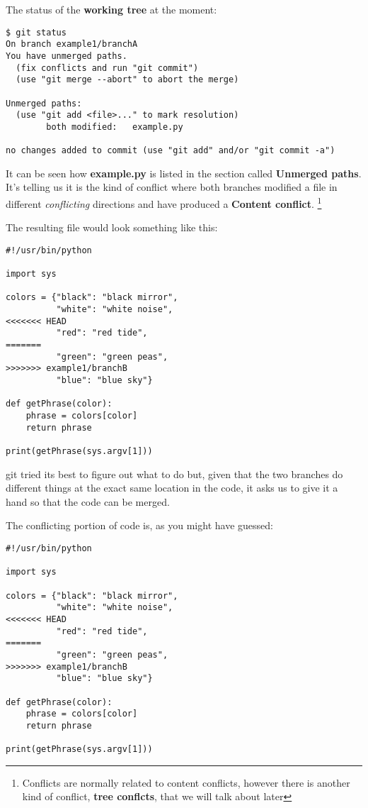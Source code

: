 The status of the {\bf working tree} at the moment:
\begin{lstlisting}[style=console_style, caption={\bf Example 1} - git status]
$ git status
On branch example1/branchA
You have unmerged paths.
  (fix conflicts and run "git commit")
  (use "git merge --abort" to abort the merge)

Unmerged paths:
  (use "git add <file>..." to mark resolution)
        both modified:   example.py

no changes added to commit (use "git add" and/or "git commit -a")
\end{lstlisting}

It can be seen how {\bf example.py} is listed in the section called {\bf Unmerged paths}. It's telling us it is the kind of conflict
where both branches modified a file in different {\it conflicting} directions and have produced a {\bf Content conflict}.
\footnote{Conflicts are normally related to content conflicts, however there is another kind of conflict, {\bf tree conflcts}, that
we will talk about later}

The resulting file would look something like this:
\begin{lstlisting}[style=python_style, caption={\bf example 1} - conflicting file]
#!/usr/bin/python

import sys

colors = {"black": "black mirror",
          "white": "white noise",
<<<<<<< HEAD
          "red": "red tide",
=======
          "green": "green peas",
>>>>>>> example1/branchB
          "blue": "blue sky"}

def getPhrase(color):
    phrase = colors[color]
    return phrase

print(getPhrase(sys.argv[1]))
\end{lstlisting}

git tried its best to figure out what to do but, given that the two branches do different things at the exact same location
in the code, it asks us to give it a hand so that the code can be merged.

The conflicting portion of code is, as you might have guessed:
\begin{lstlisting}[style=python_style, firstline=7, firstnumber=7, lastline=11, caption={\bf example 1} - conflict section]
#!/usr/bin/python

import sys

colors = {"black": "black mirror",
          "white": "white noise",
<<<<<<< HEAD
          "red": "red tide",
=======
          "green": "green peas",
>>>>>>> example1/branchB
          "blue": "blue sky"}

def getPhrase(color):
    phrase = colors[color]
    return phrase

print(getPhrase(sys.argv[1]))
\end{lstlisting}

